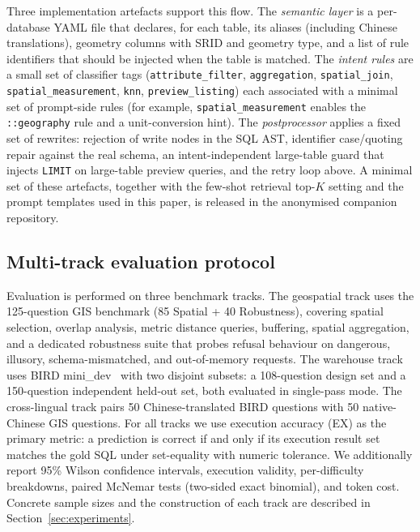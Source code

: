 \documentclass[11pt]{article}
\begin{document}
Three implementation artefacts support this flow. The \emph{semantic layer} is a per-database YAML file that declares, for each table, its aliases (including Chinese translations), geometry columns with SRID and geometry type, and a list of rule identifiers that should be injected when the table is matched. The \emph{intent rules} are a small set of classifier tags (\texttt{attribute\_filter}, \texttt{aggregation}, \texttt{spatial\_join}, \texttt{spatial\_measurement}, \texttt{knn}, \texttt{preview\_listing}) each associated with a minimal set of prompt-side rules (for example, \texttt{spatial\_measurement} enables the \texttt{::geography} rule and a unit-conversion hint). The \emph{postprocessor} applies a fixed set of rewrites: rejection of write nodes in the SQL AST, identifier case/quoting repair against the real schema, an intent-independent large-table guard that injects \texttt{LIMIT} on large-table preview queries, and the retry loop above. A minimal set of these artefacts, together with the few-shot retrieval top-$K$ setting and the prompt templates used in this paper, is released in the anonymised companion repository.

\subsection{Multi-track evaluation protocol}

Evaluation is performed on three benchmark tracks. The geospatial track uses the 125-question GIS benchmark (85 Spatial + 40 Robustness), covering spatial selection, overlap analysis, metric distance queries, buffering, spatial aggregation, and a dedicated robustness suite that probes refusal behaviour on dangerous, illusory, schema-mismatched, and out-of-memory requests. The warehouse track uses BIRD mini\_dev~\citep{li2023bird} with two disjoint subsets: a 108-question design set and a 150-question independent held-out set, both evaluated in single-pass mode. The cross-lingual track pairs 50 Chinese-translated BIRD questions with 50 native-Chinese GIS questions. For all tracks we use execution accuracy (EX) as the primary metric: a prediction is correct if and only if its execution result set matches the gold SQL under set-equality with numeric tolerance. We additionally report 95\% Wilson confidence intervals, execution validity, per-difficulty breakdowns, paired McNemar tests (two-sided exact binomial), and token cost. Concrete sample sizes and the construction of each track are described in Section~\ref{sec:experiments}.
\end{document}
